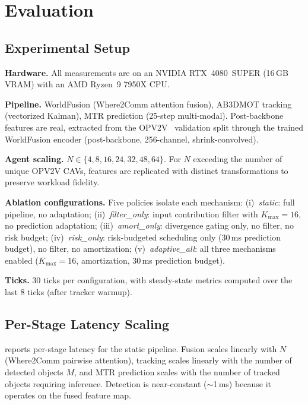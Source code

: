 \section{Evaluation}
\label{sec:eval}

\subsection{Experimental Setup}

\textbf{Hardware.}  All measurements are on an NVIDIA RTX~4080~SUPER
(16\,GB VRAM) with an AMD Ryzen~9 7950X CPU.

\textbf{Pipeline.}  WorldFusion (Where2Comm attention fusion),
AB3DMOT tracking (vectorized Kalman), MTR prediction (25-step
multi-modal).  Post-backbone features are real, extracted from the
OPV2V~\cite{xu2022opencood} validation split through the trained
WorldFusion encoder (post-backbone, 256-channel, shrink-convolved).

\textbf{Agent scaling.}  $N \in \{4, 8, 16, 24, 32, 48, 64\}$.
For $N$ exceeding the number of unique OPV2V CAVs, features are
replicated with distinct transformations to preserve workload fidelity.

\textbf{Ablation configurations.}
Five policies isolate each mechanism:
(i)~\textit{static}: full pipeline, no adaptation;
(ii)~\textit{filter\_only}: input contribution filter with $K_{\max}{=}16$,
  no prediction adaptation;
(iii)~\textit{amort\_only}: divergence gating only, no filter, no risk budget;
(iv)~\textit{risk\_only}: risk-budgeted scheduling only (30\,ms prediction
  budget), no filter, no amortization;
(v)~\textit{adaptive\_all}: all three mechanisms enabled
  ($K_{\max}{=}16$, amortization, 30\,ms prediction budget).

\textbf{Ticks.}  30 ticks per configuration, with steady-state metrics
computed over the last 8 ticks (after tracker warmup).

\subsection{Per-Stage Latency Scaling}

 reports per-stage latency for the static
pipeline.  Fusion scales linearly with $N$ (Where2Comm pairwise
attention), tracking scales linearly with the number of detected
objects $M$, and MTR prediction scales with the number of tracked
objects requiring inference.  Detection is near-constant ($\sim$1\,ms)
because it operates on the fused feature map.

